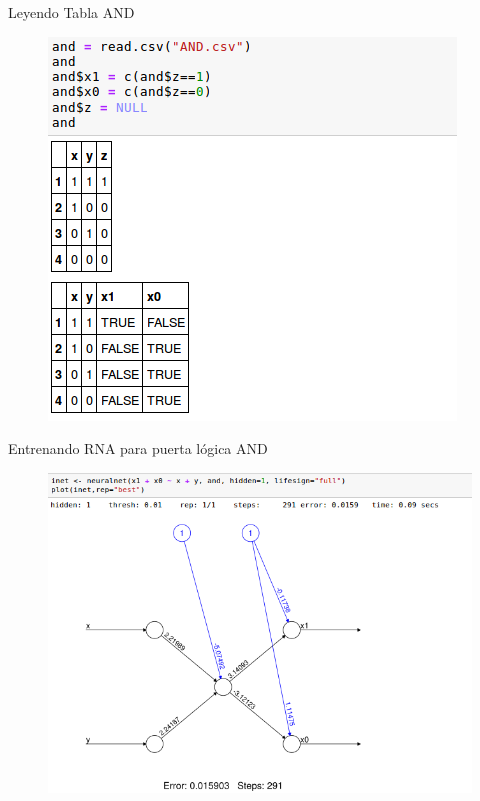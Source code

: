 \documentclass{beamer}
\begin{document}
\begin{frame}
\begin{block}{Leyendo Tabla AND}
\begin{figure}
\includegraphics[scale=0.4]{readand.png}
\centering
\end{figure}
\end{block}
\end{frame}

\begin{frame}
\begin{block}{Entrenando RNA para puerta lógica AND}
\begin{figure}
\includegraphics[scale=0.4]{neuralnetand.png}
\centering
\end{figure}
\end{block}
\end{frame}
\end{document}
